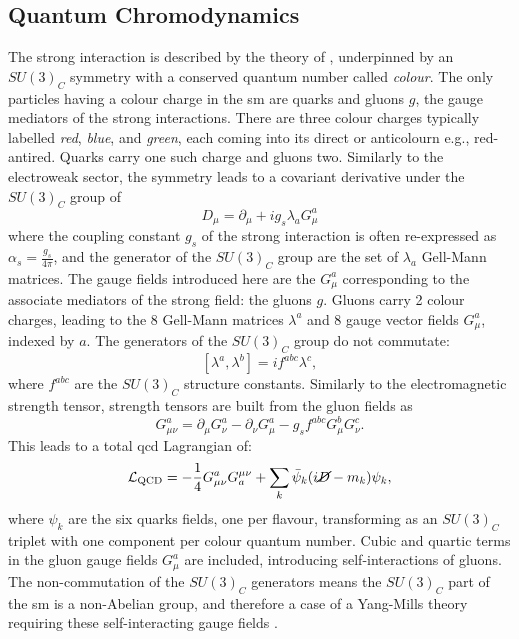 \subsection{Quantum Chromodynamics}
The strong interaction is described by the theory of \textit{}, underpinned by an $SU(3)_C$ symmetry with a conserved quantum number called \textit{colour}. The only particles having a colour charge in the \gls{sm} are quarks and gluons $g$, the gauge mediators of the strong interactions. There are three colour charges typically labelled \textit{red}, \textit{blue}, and \textit{green}, each coming into its direct or anticolourn e.g., red-antired. Quarks carry one such charge and gluons two. Similarly to the electroweak sector, the symmetry leads to a covariant derivative under the $SU(3)_C$ group of
\begin{equation}\label{eq-GaugeQCD}
    D_{\mu}  = \partial_{\mu} + ig_s \lambda_a G_{\mu}^a %
\end{equation}
where the coupling constant $g_s$ of the strong interaction is often re-expressed as $\alpha_s = \frac{g_s}{4\pi}$, and the generator of the $SU(3)_C$ group are the set of $\lambda_a$ Gell-Mann matrices. The gauge fields introduced here are the $G_{\mu}^a$ corresponding to the associate mediators of the strong field: the gluons $g$. Gluons carry 2 colour charges, leading to the 8 Gell-Mann matrices $\lambda^a$ and 8 gauge vector fields $G_{\mu}^a$, indexed by $a$. The generators of the $SU(3)_C$ group do not commutate: \[ [\lambda^a, \lambda^b] = i f^{abc} \lambda^c,\] where $f^{abc}$ are the $SU(3)_C$ structure constants.  Similarly to the electromagnetic strength tensor, strength tensors are built from the gluon fields as \[G_{\mu\nu}^a = \partial_{\mu} G_{\nu}^a   - \partial_{\nu} G_{\mu}^a - g_s f^{abc} G_{\mu}^b G_{\nu}^c.\]
This leads to a total \gls{qcd} Lagrangian of:
\begin{equation}\label{eq-QCDLag}
    \mathcal{L}_{\text{QCD}} = -\frac{1}{4} G_{\mu\nu}^a G^{\mu\nu}_a + \sum_{k} \bar{\psi}_k (i \cancel{D} - m_k) \psi_k,
\end{equation}
where $\psi_k$ are the six quarks fields, one per flavour, transforming as an $SU(3)_C$ triplet with one component per colour quantum number. Cubic and quartic terms in the gluon gauge fields $G_{\mu}^a$ are included, introducing self-interactions of gluons. The non-commutation of the $SU(3)_C$ generators means the $SU(3)_C$ part of the \gls{sm} is a non-Abelian group, and therefore a case of a Yang-Mills theory requiring these self-interacting gauge fields \cite{PhysRev.96.191}. \\


